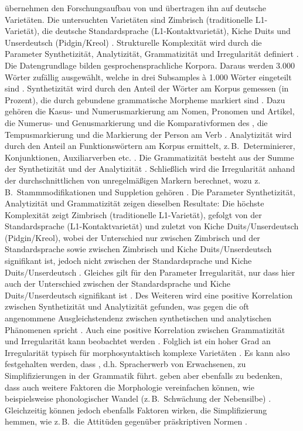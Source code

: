 \citet{MaitzNémeth2014} übernehmen den Forschungsaufbau von \citet{SzmrecsanyiKortmann2009} und übertragen ihn auf deutsche Varietäten. Die untersuchten Varietäten sind Zimbrisch (traditionelle L1-Va\-rie\-tä\-t), die deutsche Standardsprache (L1-Kon\-takt\-va\-rie\-tät), Kiche Duits und Unserdeutsch (Pidgin/Kreol) \citep[7--9]{MaitzNémeth2014}. Strukturelle Komplexität wird durch die Parameter Synthetizität, Analytizität, Grammatizität und Irregularität definiert \citep[6--7]{MaitzNémeth2014}. Die Datengrundlage bilden gesprochensprachliche Korpora. Daraus werden 3.000 Wörter zufällig ausgewählt, welche in drei Subsamples à 1.000 Wörter eingeteilt sind \citep[9]{MaitzNémeth2014}. Synthetizität wird durch den Anteil der Wörter am Korpus gemessen (in Prozent), die durch gebundene grammatische Morpheme markiert sind \citep[10]{MaitzNémeth2014}. Dazu gehören die Kasus- und Numerusmarkierung am Nomen, Pronomen und Artikel, die Nu\-me\-rus- und Genusmarkierung und die Komparativformen des , die Tempusmarkierung und die Markierung der Person am Verb \citep[10]{MaitzNémeth2014}. Analytizität wird durch den Anteil an Funktionswörtern am Korpus ermittelt, z.\,B.\ Determinierer, Konjunktionen, Auxiliarverben etc. \citep[11--12]{MaitzNémeth2014}. Die Grammatizität besteht aus der Summe der Synthetizität und der Analytizität \citep[12]{MaitzNémeth2014}. Schließlich wird die Irregularität anhand der durchschnittlichen  von unregelmäßigen Markern berechnet, wozu z.\,B.\ Stammmodifikationen und Suppletion gehören \citep[12--13]{MaitzNémeth2014}. Die Parameter Synthetizität, Analytizität und Grammatizität zeigen dieselben Resultate: Die höchste Komplexität zeigt Zimbrisch (traditionelle L1-Va\-rie\-tät), gefolgt von der Standardsprache (L1-Kon\-takt\-va\-rie\-tät) und zuletzt von Kiche Duits/Unserdeutsch (Pidgin/Kreol), wobei der Unterschied nur zwischen Zimbrisch und der Standardsprache sowie zwischen Zimbrisch und Kiche Duits/Unserdeutsch signifikant ist, jedoch nicht zwischen der Standardsprache und Kiche Duits/Unserdeutsch \citep[11--13]{MaitzNémeth2014}. Gleiches gilt für den Parameter Irregularität, nur dass hier auch der Unterschied zwischen der Standardsprache und Kiche Duits/Unserdeutsch signifikant ist \citep[14]{MaitzNémeth2014}. Des Weiteren wird eine positive Korrelation zwischen Synthetizität und Analytizität gefunden, was gegen die oft angenommene Ausgleichstendenz zwischen synthetischen und analytischen Phänomenen spricht \citep[15]{MaitzNémeth2014}. Auch eine positive Korrelation zwischen Grammatizität und Irregularität kann beobachtet werden \citep[15]{MaitzNémeth2014}. Folglich ist ein hoher Grad an Irregularität typisch für morphosyntaktisch komplexe Varietäten \citep[17]{MaitzNémeth2014}. Es kann also festgehalten werden, dass , d.h. Spracherwerb von Erwachsenen, zu Simplifizierungen in der Grammatik führt. \citet{MaitzNémeth2014} geben aber ebenfalls zu bedenken, dass auch weitere Faktoren die Morphologie vereinfachen können, wie beispielsweise phonologischer Wandel (z.\,B.\ Schwächung der Nebensilbe) \citep[20]{MaitzNémeth2014}. Gleichzeitig können jedoch ebenfalls Faktoren wirken, die Simplifizierung hemmen, wie z.\,B.\ die Attitüden gegenüber präskriptiven Normen \citep[21]{MaitzNémeth2014}.
 
